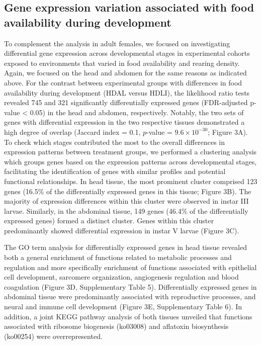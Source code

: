 \documentclass[lineno]{wiley-article}
\begin{document}
\subsection{Gene expression variation associated with food availability during development}
To complement the analysis in adult females, we focused on investigating differential gene expression across developmental stages in experimental cohorts exposed to environments that varied in food availability and rearing density. Again, we focused on the head and abdomen for the same reasons as indicated above. For the contrast between experimental groups with differences in food availability during development (HDAL versus HDLI), the likelihood ratio tests revealed 745 and 321 significantly differentially expressed genes (FDR-adjusted p-value < 0.05) in the head and abdomen, respectively. Notably, the two sets of genes with differential expression in the two respective tissues demonstrated a high degree of overlap (Jaccard index = 0.1, \( p \)-value = \( 9.6 \times 10^{-30} \); Figure 3A). To check which stages contributed the most to the overall differences in expression patterns between treatment groups, we performed a clustering analysis which groups genes based on the expression patterns across developmental stages, facilitating the identification of genes with similar profiles and potential functional relationships. In head tissue, the most prominent cluster comprised 123 genes (16.5\% of the differentially expressed genes in this tissue; Figure 3B). The majority of expression differences within this cluster were observed in instar III larvae. Similarly, in the abdominal tissue, 149 genes (46.4\% of the differentially expressed genes) formed a distinct cluster. Genes within this cluster predominantly showed differential expression in instar V larvae (Figure 3C).



The GO term analysis for differentially expressed genes in head tissue revealed both a general enrichment of functions related to metabolic processes and regulation and more specifically enrichment of functions associated with epithelial cell development, sarcomere organization, angiogenesis regulation and blood coagulation (Figure 3D, Supplementary Table 5). Differentially expressed genes in abdominal tissue were predominantly associated with reproductive processes, and neural and immune cell development (Figure 3E, Supplementary Table 6). In addition, a joint KEGG pathway analysis of both tissues unveiled that functions associated with ribosome biogenesis (ko03008) and aflatoxin biosynthesis (ko00254) were overrepresented.
\end{document}
